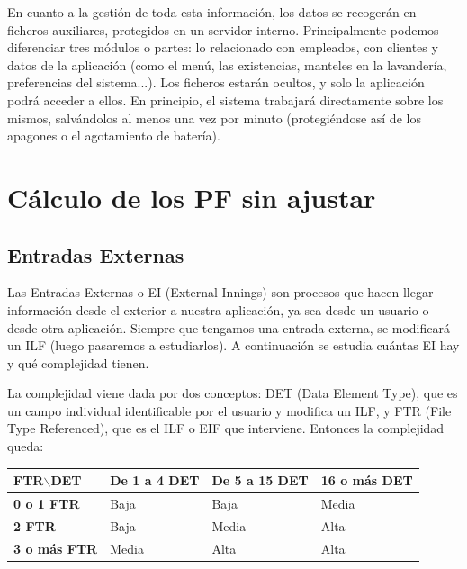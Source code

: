 \documentclass[spanish,a4paper,12pt]{report}	%
\begin{document}
En cuanto a la gestión de toda esta información, los datos se recogerán en ficheros auxiliares, protegidos en un servidor interno. Principalmente podemos diferenciar tres módulos o partes: lo relacionado con empleados, con clientes y datos de la aplicación (como el menú, las existencias, manteles en la lavandería, preferencias del sistema...). Los ficheros estarán ocultos, y solo la aplicación podrá acceder a ellos. En principio, el sistema trabajará directamente sobre los mismos, salvándolos al menos una vez por minuto (protegiéndose así de los apagones o el agotamiento de batería).

\section{Cálculo de los PF sin ajustar}
	\subsection{Entradas Externas}
	Las Entradas Externas o EI (External Innings) son procesos que hacen llegar información desde el exterior a nuestra aplicación, ya sea desde un usuario o desde otra aplicación. Siempre que tengamos una entrada externa, se modificará un ILF (luego pasaremos a estudiarlos). A continuación se estudia cuántas EI hay y qué complejidad tienen. 

	La complejidad viene dada por dos conceptos: DET (Data Element Type), que es un campo individual identificable por el usuario y modifica un ILF, y FTR (File Type Referenced), que es el ILF o EIF que interviene. Entonces la complejidad queda: 

\vspace{0.35cm}

			\begin{tabular}{|p{3cm}||p{3cm}|p{3.2cm}|p{3cm}|}
				\hline
				\textbf{FTR$\backslash$DET} & \textbf{De 1 a 4 DET} & \textbf{De 5 a 15 DET} & \textbf{16  o más DET} \\ \hline \hline
				\textbf{0 o 1 FTR} & Baja & Baja & Media \\ \hline 
				\textbf{2 FTR} & Baja & Media & Alta \\ \hline 
				\textbf{3 o más FTR} & Media & Alta & Alta \\ \hline 
			\end{tabular}

\vspace{0.35cm}
\end{document}
